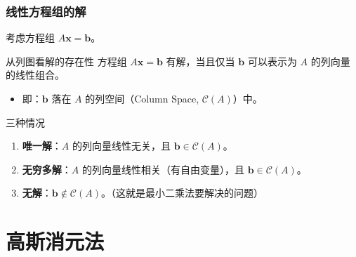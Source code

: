 
\begin{frame}
\frametitle{线性方程组的解}

考虑方程组 $A\mathbf{x} = \mathbf{b}$。

\begin{block}{从列图看解的存在性}
方程组 $A\mathbf{x} = \mathbf{b}$ 有解，当且仅当 $\mathbf{b}$ 可以表示为 $A$ 的列向量的线性组合。
\begin{itemize}
    \item 即：$\mathbf{b}$ 落在 $A$ 的列空间（Column Space, $\mathcal{C}(A)$）中。
\end{itemize}
\end{block}

\pause

\begin{block}{三种情况}
\begin{enumerate}
    \item \textbf{唯一解}：$A$ 的列向量线性无关，且 $\mathbf{b} \in \mathcal{C}(A)$。
    \item \textbf{无穷多解}：$A$ 的列向量线性相关（有自由变量），且 $\mathbf{b} \in \mathcal{C}(A)$。
    \item \textbf{无解}：$\mathbf{b} \notin \mathcal{C}(A)$。（这就是最小二乘法要解决的问题）
\end{enumerate}
\end{block}

\end{frame}


\section{高斯消元法}


